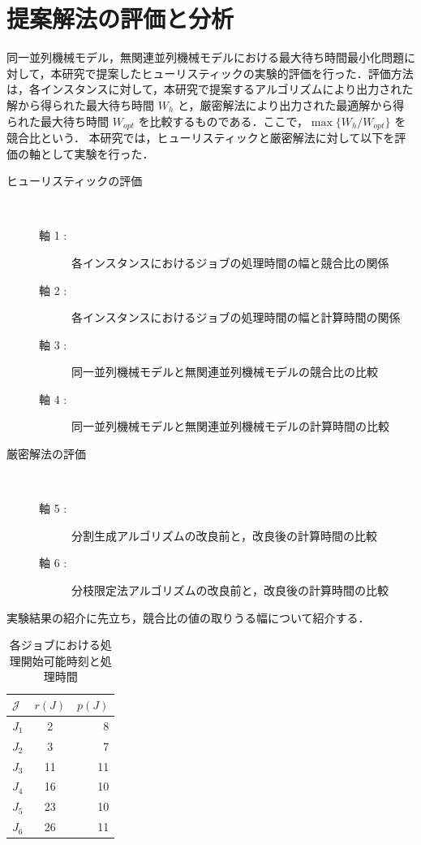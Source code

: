 \documentclass[12pt]{optlab-bachelor}
\begin{document}
\section{提案解法の評価と分析}\label{5_s_3}
同一並列機械モデル，無関連並列機械モデルにおける最大待ち時間最小化問題に対して，本研究で提案したヒューリスティックの実験的評価を行った．評価方法は，各インスタンスに対して，本研究で提案するアルゴリズムにより出力された解から得られた最大待ち時間 $W_h$ と，厳密解法により出力された最適解から得られた最大待ち時間 $W_{opt}$ を比較するものである．ここで，$\max\{W_h/W_{opt}\}$ を競合比という．
本研究では，ヒューリスティックと厳密解法に対して以下を評価の軸として実験を行った．

\begin{description}
  \item[ヒューリスティックの評価] ~
  \begin{description}
    \item[軸 1 :] 各インスタンスにおけるジョブの処理時間の幅と競合比の関係
    \item[軸 2 :] 各インスタンスにおけるジョブの処理時間の幅と計算時間の関係
    \item[軸 3 :] 同一並列機械モデルと無関連並列機械モデルの競合比の比較
    \item[軸 4 :] 同一並列機械モデルと無関連並列機械モデルの計算時間の比較
  \end{description}
  \item[厳密解法の評価] ~
  \begin{description}
    \item[軸 5 :] 分割生成アルゴリズムの改良前と，改良後の計算時間の比較
    \item[軸 6 :] 分枝限定法アルゴリズムの改良前と，改良後の計算時間の比較
  \end{description}
\end{description}

実験結果の紹介に先立ち，競合比の値の取りうる幅について紹介する．
\begin{table}[htb]
  \begin{center}
    \begin{tabular}{|l|c|r|} \hline
      $\mathcal{J}$ & $r(J)$ & $p(J)$ \\ \hline \hline
      $J_1$ & 2 & 8 \\ \hline
      $J_2$ & 3 & 7 \\ \hline
      $J_3$ & 11 & 11 \\ \hline
      $J_4$ & 16 & 10 \\ \hline
      $J_5$ & 23 & 10 \\ \hline
      $J_6$ & 26 & 11 \\ \hline
    \end{tabular}
    \caption{各ジョブにおける処理開始可能時刻と処理時間}
  \end{center}
\end{table}
\end{document}
